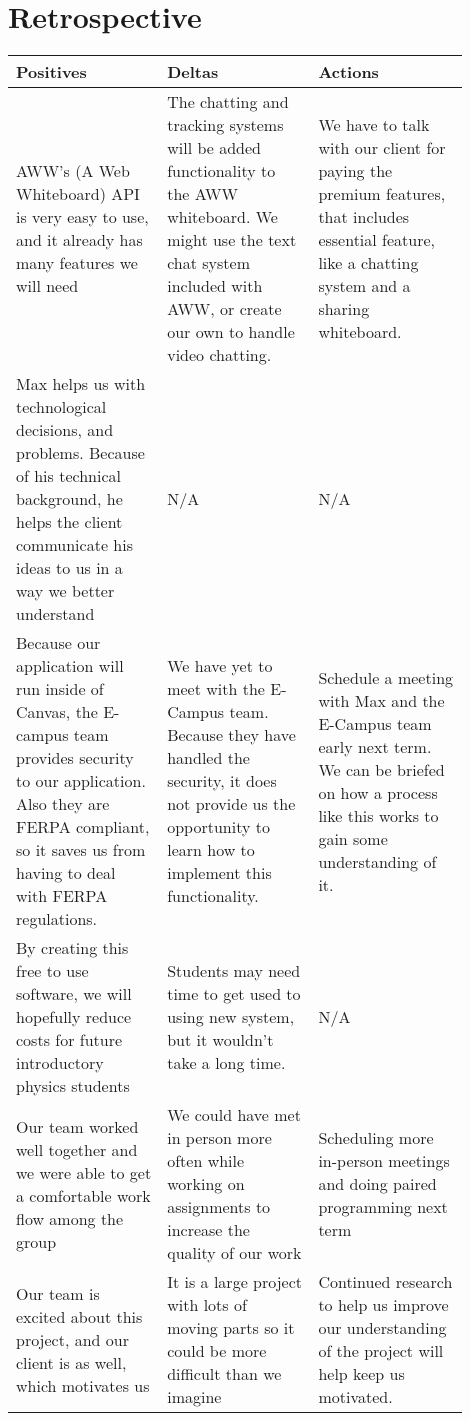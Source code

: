 \documentclass[onecolumn, draftclsnofoot,10pt, compsoc]{IEEEtran}
\begin{document}
\section{Retrospective}
\begin{tabular}{ | p{0.3\linewidth} | p{0.3\linewidth} | p{0.3\linewidth} | }
\hline
Positives & Deltas & Actions \\ \hline
        AWW’s (A Web Whiteboard) API is very easy to use, and it already has many features we will need
     &  The chatting and tracking systems will be added functionality to the AWW whiteboard. We might use the text chat system included with AWW, or create our own to handle video chatting.
     &  We have to talk with our client for paying the premium features, that includes essential feature, like a chatting system and a sharing whiteboard. \\ \hline
     Max helps us with technological decisions, and problems. Because of his technical background, he helps the client communicate his ideas to us in a way we better understand
     &
     N/A
     &
     N/A    \\ \hline
     Because our application will run inside of Canvas, the E-campus team provides security to our application. Also they are FERPA compliant, so it saves us from having to deal with FERPA regulations.
     &
     We have yet to meet with the E-Campus team. Because they have handled the security, it does not provide us the opportunity to learn how to implement this functionality.
     &
     Schedule a meeting with Max and the E-Campus team early next term. We can be briefed on how a process like this works to gain some understanding of it. \\  \hline
     By creating this free to use software, we will hopefully reduce costs for future introductory physics students
     &
     Students may need time to get used to using new system, but it wouldn’t take a long time.
     &
     N/A
     \\ \hline
     Our team worked well together and we were able to get a comfortable work flow among the group
     &
     We could have met in person more often while working on assignments to increase the quality of our work
     &
     Scheduling more in-person meetings and doing paired programming next term
     \\ \hline
     Our team is excited about this project, and our client is as well, which motivates us
     &
     It is a large project with lots of moving parts so it could be more difficult than we imagine
     &
     Continued research to help us improve our understanding of the project will help keep us motivated. \\ \hline

\end{tabular}
\end{document}

